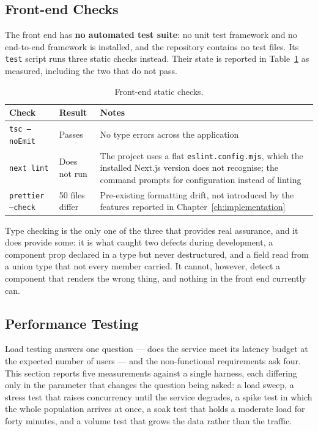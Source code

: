 \documentclass[a4paper]{article}
\begin{document}
\subsection{Front-end Checks}
\label{sec:fe-checks}

The front end has \textbf{no automated test suite}: no unit test framework and
no end-to-end framework is installed, and the repository contains no test
files. Its \texttt{test} script runs three static checks instead. Their state
is reported in Table~\ref{tab:fe-checks} as measured, including the two that
do not pass.

\begin{table}[H]
\centering
\caption{Front-end static checks.}
\label{tab:fe-checks}
\small
\begin{tabular}{|p{3.4cm}|p{3cm}|p{7cm}|}
\hline
\textbf{Check} & \textbf{Result} & \textbf{Notes} \\
\hline
\texttt{tsc --noEmit} & Passes & No type errors across the application \\
\hline
\texttt{next lint} & Does not run & The project uses a flat
\texttt{eslint.config.mjs}, which the installed Next.js version does not
recognise; the command prompts for configuration instead of linting \\
\hline
\texttt{prettier --check} & 50 files differ & Pre-existing formatting drift,
not introduced by the features reported in Chapter~\ref{ch:implementation} \\
\hline
\end{tabular}
\end{table}

Type checking is the only one of the three that provides real assurance, and it
does provide some: it is what caught two defects during development, a
component prop declared in a type but never destructured, and a field read from
a union type that not every member carried. It cannot, however, detect a
component that renders the wrong thing, and nothing in the front end currently
can.

\subsection{Performance Testing}
\label{sec:perf-testing}

Load testing answers one question --- does the service meet its latency budget
at the expected number of users --- and the non-functional requirements ask
four. This section reports five measurements against a single harness, each
differing only in the parameter that changes the question being asked: a load
sweep, a stress test that raises concurrency until the service degrades, a
spike test in which the whole population arrives at once, a soak test that
holds a moderate load for forty minutes, and a volume test that grows the data
rather than the traffic.
\end{document}
